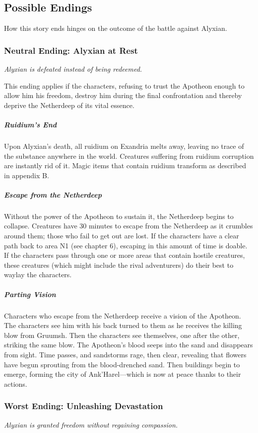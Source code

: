 \documentclass[10pt,a4paper,twoside,fancy,bg=print,twocolumn,openany,nodeprecatedcode]{dndbook}
\begin{document}
\subsection{Possible Endings}
How this story ends hinges on the outcome of the battle against Alyxian.

\subsubsection{Neutral Ending: Alyxian at Rest}
\textit{Alyxian is defeated instead of being redeemed.}

This ending applies if the characters, refusing to trust the Apotheon enough to allow him his freedom, destroy him during the final confrontation and thereby deprive the Netherdeep of its vital essence.

\subparagraph{Ruidium's End}
Upon Alyxian's death, all ruidium on Exandria melts away, leaving no trace of the substance anywhere in the world. Creatures suffering from ruidium corruption are instantly rid of it. Magic items that contain ruidium transform as described in appendix B.

\subparagraph{Escape from the Netherdeep}
Without the power of the Apotheon to sustain it, the Netherdeep begins to collapse. Creatures have 30 minutes to escape from the Netherdeep as it crumbles around them; those who fail to get out are lost. If the characters have a clear path back to area N1 (see chapter 6), escaping in this amount of time is doable. If the characters pass through one or more areas that contain hostile creatures, these creatures (which might include the rival adventurers) do their best to waylay the characters.

\subparagraph{Parting Vision}
Characters who escape from the Netherdeep receive a vision of the Apotheon. The characters see him with his back turned to them as he receives the killing blow from Gruumsh. Then the characters see themselves, one after the other, striking the same blow. The Apotheon's blood seeps into the sand and disappears from sight. Time passes, and sandstorms rage, then clear, revealing that flowers have begun sprouting from the blood-drenched sand. Then buildings begin to emerge, forming the city of Ank'Harel—which is now at peace thanks to their actions.

\subsubsection{Worst Ending: Unleashing Devastation}
\textit{Alyxian is granted freedom without regaining compassion.}
\end{document}
